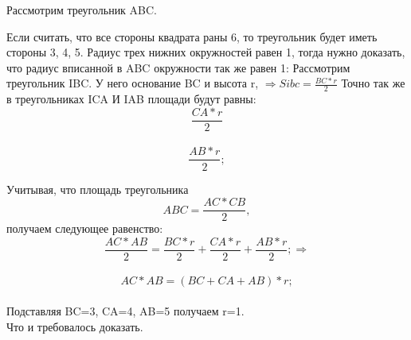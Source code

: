 \solutionSection

Рассмотрим треугольник ABC. 

Если считать, что все стороны квадрата раны 6, то треугольник будет иметь стороны 3, 4, 5. Радиус трех нижних окружностей равен 1, тогда нужно доказать, что радиус вписанной в ABC окружности так же равен 1: 
Рассмотрим треугольник IBC. У него основание BC и высота r, $\Rightarrow Sibc =  \frac{BC*r}{2}$
Точно так же в треугольниках ICA И IAB площади будут равны:
\begin{displaymath} 
\frac{CA*r}{2} 
\end{displaymath}\\
\begin{displaymath} 
\frac{AB*r}{2};
\end{displaymath}

Учитывая, что площадь треугольника \begin{displaymath}  ABC = \frac{AC*CB}{2}, \end{displaymath} получаем следующее равенство: 
\begin{displaymath}
\frac{AC*AB}{2} = \frac{BC*r}{2} + \frac{CA*r}{2} +  \frac{AB*r}{2}; \Rightarrow 
\end{displaymath}\\
\begin{displaymath}
AC*AB = (BC + CA + AB)*r;
\end{displaymath}\\

Подставляя BC=3, CA=4, AB=5 получаем r=1.\\

Что и требовалось доказать.